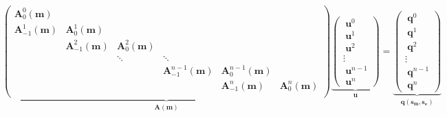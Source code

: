 \documentclass[preprint,review,3p,times,onecolumn,authoryear]{elsarticle}
\begin{document}
\begin{equation}
    \underbrace{
        \begin{pmatrix}
            \mathbf{A}^{0}_{0}(\mathbf{m})  &                                 &                                &                                   &                                   &                                  \\
            \mathbf{A}^{1}_{-1}(\mathbf{m}) & \mathbf{A}^{1}_{0}(\mathbf{m})  &                                &                                   &                                   &                                  \\
                                            & \mathbf{A}^{2}_{-1}(\mathbf{m}) & \mathbf{A}^{2}_{0}(\mathbf{m}) &                                   &                                   &                                  \\
                                            &                                 & \ddots                         & \ddots                            &                                   &                                  \\
                                            &                                 &                                & \mathbf{A}^{n-1}_{-1}(\mathbf{m}) & \mathbf{A}^{n-1}_{0}(\mathbf{m})  &                                  \\
                                            &                                 &                                &                                   & \mathbf{A}^{n}_{-1}(\mathbf{m})   & \mathbf{A}^{n}_{0}(\mathbf{m})   \\
        \end{pmatrix}
    }_{\mathbf{A(m)}}
    \underbrace{
        \begin{pmatrix}
            ~\mathbf{u}^{0~~~}     \\
            ~\mathbf{u}^{1~~~}     \\
            ~\mathbf{u}^{2~~~}     \\
            \vdots~                 \\
            ~\mathbf{u}^{n-1}       \\
            ~\mathbf{u}^{n~~~}
        \end{pmatrix}
    }_{\mathbf{u}}
    =
    \underbrace{
        \begin{pmatrix}
            ~\mathbf{q}^{0~~~}     \\
            ~\mathbf{q}^{1~~~}     \\
            ~\mathbf{q}^{2~~~}     \\
            \vdots~                 \\
            ~\mathbf{q}^{n-1}       \\
            ~\mathbf{q}^{n~~~}
        \end{pmatrix}
    }_{\mathbf{q(s_m, s_e)}}
    \label{eq:TDEM_full}
\end{equation}
\end{document}

